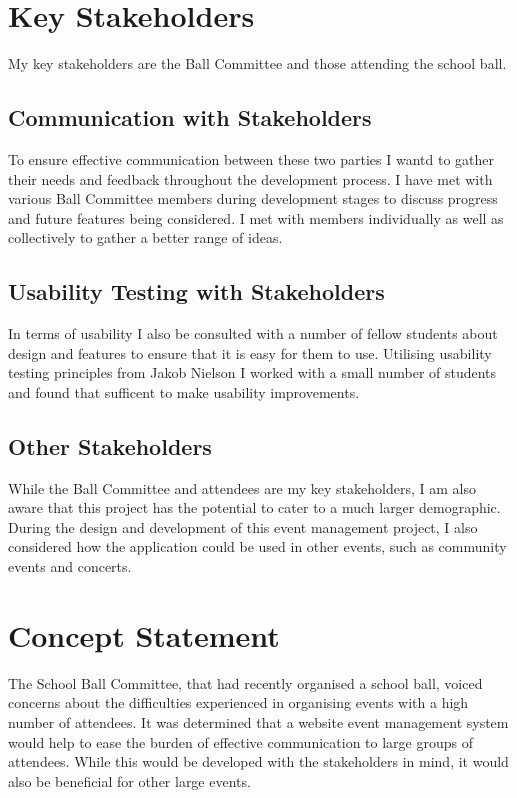 \documentclass[a4paper,oneside,12pt]{report}
\begin{document}
	\section{Key Stakeholders}
	My key stakeholders are the Ball Committee and those attending the school ball. 

	\subsection{Communication with Stakeholders}	
	To ensure effective communication between these two parties I wantd to gather their needs and feedback throughout the development process. I have met with various Ball Committee members during development stages to discuss progress and future features being considered. I met with members individually as well as collectively to gather a better range of ideas.
	
	\subsection{Usability Testing with Stakeholders}
	In terms of usability I also be consulted with a number of fellow students about design and features to ensure that it is easy for them to use. Utilising usability testing principles from Jakob Nielson  I worked with a small number of students and found that sufficent to make usability improvements.
	
	\subsection{Other Stakeholders}
	While the Ball Committee and attendees are my key stakeholders, I am also aware that this project has the potential to cater to a much larger demographic. During the design and development of this event management project, I also considered how the application could be used in other events, such as community events and concerts.

	\section{Concept Statement}
	The School Ball Committee, that had recently organised a school ball, voiced concerns about the difficulties experienced in organising events with a high number of attendees. It was determined that a website event management system would help to ease the burden of effective communication to large groups of attendees. While this would be developed with the stakeholders in mind, it would also be beneficial for other large events.
\end{document}
